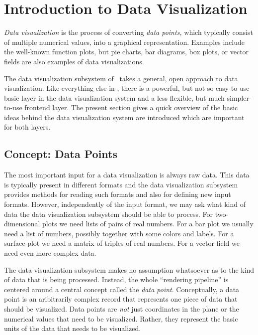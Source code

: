 %
%
%


\section{Introduction to Data Visualization}


\emph{Data visualization} is the process of converting \emph{data
  points,} which typically consist of multiple numerical values, into
a graphical representation. Examples include the well-known function
plots, but pie charts, bar diagrams, box plots, or vector fields are
also examples of data visualizations.

The data visualization subsystem of \pgfname\ takes a general, open
approach to data visualization. Like everything else in \pgfname,
there is a powerful, but not-so-easy-to-use basic layer in the data
visualization system and a less flexible, but much simpler-to-use
frontend layer. The present section gives a quick overview of the
basic ideas behind the data visualization system are introduced which
are important for both layers.


\subsection{Concept: Data Points}

The most important input for a data visualization is always raw
data. This data is typically present in different formats and the data
visualization subsystem provides methods for reading such formats and
also for defining new input formats. However, independently of the
input format, we may ask what kind of data the data visualization
subsystem should be able to process. For two-dimensional plots we
need lists of pairs of real numbers. For a bar plot we usually need a
list of numbers, possibly together with some colors and labels. For a
surface plot we need a matrix of triples of real numbers. For a vector
field we need even more complex data.

The data visualization subsystem makes no assumption whatsoever as to
the kind of data that is being processed. Instead, the whole
``rendering pipeline'' is centered around a central concept called the
\emph{data point}. Conceptually, a data point is an aribitrarily
complex record that represents one piece of data that should be
visualized. Data points are \emph{not} just coordinates in the plane
or the numerical values that need to be visualized. Rather, they
represent the basic units of the data that needs to be visualized.

